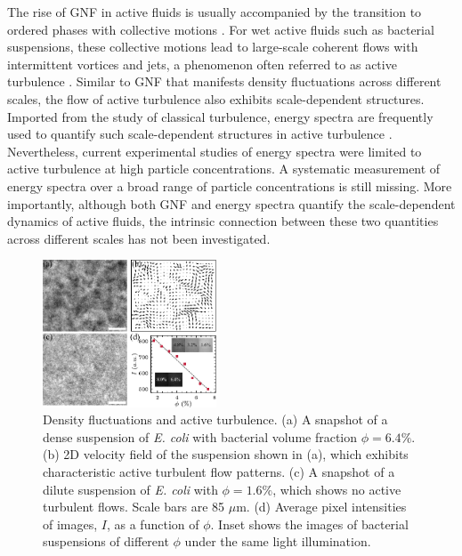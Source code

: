 \documentclass[twocolumn,aps,prx,amsmath,amssymb,longbibliography,superscriptaddress]{revtex4-2}
\begin{document}
The rise of GNF in active fluids is usually accompanied by the transition to ordered phases with collective motions \cite{Ramaswamy2010,Marchetti2013}. For wet active fluids such as bacterial suspensions, these collective motions lead to large-scale coherent flows with intermittent vortices and jets, a phenomenon often referred to as active turbulence \cite{Wolgemuth2008,Ishikawa2011,Wensink2012,Dunkel2013a,Bratanov2015,Peng2016,Guo2018,Linkmann2019,Bardfalvy2019,Alert2020,Skultety2020,Peng2020}. Similar to GNF that manifests density fluctuations across different scales, the flow of active turbulence also exhibits scale-dependent structures. Imported from the study of classical turbulence, energy spectra are frequently used to quantify such scale-dependent structures in active turbulence \cite{Ishikawa2011,Wensink2012,Dunkel2013a,Giomi2015,Creppy2015,Patteson2018,Bardfalvy2019,Alert2020}. Nevertheless, current experimental studies of energy spectra were limited to active turbulence at high particle concentrations. A systematic measurement of energy spectra over a broad range of particle concentrations is still missing. More importantly, although both GNF and energy spectra quantify the scale-dependent dynamics of active fluids, the intrinsic connection between these two quantities across different scales has not been investigated.

%
\begin{figure}[t]
	\begin{center}
		\includegraphics[width=0.46\textwidth]{Figures/fig-1.pdf}
		\caption[Experimental details]
		{Density fluctuations and active turbulence.
			(a) A snapshot of a dense suspension of \textit{E. coli} with bacterial volume fraction $\phi = 6.4\%$.
			(b) 2D velocity field of the suspension shown in (a), which exhibits characteristic active turbulent flow patterns.
			(c) A snapshot of a dilute suspension of \textit{E. coli} with $\phi = 1.6\%$, which shows no active turbulent flows. Scale bars are 85 $\mu$m.
			(d) Average pixel intensities of images, $I$, as a function of $\phi$. Inset shows the images of bacterial suspensions of different $\phi$ under the same light illumination.
		}
		\label{fig:experiment}
	\end{center}
\end{figure}
\end{document}
